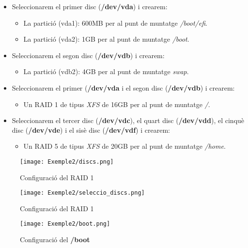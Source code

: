 \begin{itemize}
        \item Seleccionarem el primer disc (\textbf{/dev/vda}) i crearem:
        \begin{itemize}
                \item La partició (vda1): 600MB per al punt de muntatge \textit{/boot/efi}.
                \item La partició (vda2): 1GB per al punt de muntatge \textit{/boot}.
        \end{itemize}
        \item Seleccionarem el segon disc (\textbf{/dev/vdb}) i crearem:
        \begin{itemize}
                \item La partició (vdb2): 4GB per al punt de muntatge \textit{swap}.
        \end{itemize}
        \item Seleccionarem el primer (\textbf{/dev/vda} i el segon disc (\textbf{/dev/vdb}) i crearem:
        \begin{itemize}
                \item Un RAID 1 de tipus \textit{XFS} de 16GB per al punt de muntatge \textit{/}.
        \end{itemize}
        \item Seleccionarem el tercer disc (\textbf{/dev/vdc}), el quart disc (\textbf{/dev/vdd}), el cinquè disc (\textbf{/dev/vde}) i el sisè disc (\textbf{/dev/vdf}) i crearem:
        \begin{itemize}
                \item Un RAID 5 de tipus \textit{XFS} de 20GB per al punt de muntatge \textit{/home}.
        \end{itemize}  
\end{itemize}


\begin{figure}[!htb]
        \centering
        \texttt{[image: Exemple2/discs.png]}
        \caption{Configuració del RAID 1}
        \label{fig:ex2_discs1}
\end{figure}
        
\begin{figure}[!htb]
        \centering
        \texttt{[image: Exemple2/seleccio\_discs.png]}
        \caption{Configuració del RAID 1}
        \label{fig:ex2_discs2}
\end{figure}

\begin{figure}[!htb]
        \centering
        \texttt{[image: Exemple2/boot.png]}
        \caption{Configuració del \textbf{/boot}}
        \label{fig:ex2_boot}
\end{figure}

